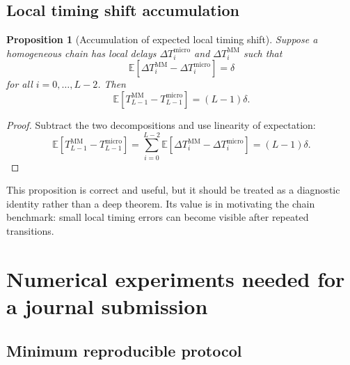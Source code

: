 \documentclass[12pt,a4paper]{article}
\newtheorem{proposition}{Proposition}
\theoremstyle{definition}
\newcommand{\E}{\mathbb{E}}
\newcommand{\1}{\mathbf{1}}
\begin{document}
\subsection{Local timing shift accumulation}

\begin{proposition}[Accumulation of expected local timing shift]
Suppose a homogeneous chain has local delays $\Delta T_i^{\mathrm{micro}}$ and $\Delta T_i^{\mathrm{MM}}$ such that
\begin{equation}
    \E[\Delta T_i^{\mathrm{MM}}-\Delta T_i^{\mathrm{micro}}]=\delta
\end{equation}
for all $i=0,\ldots,L-2$.  Then
\begin{equation}
    \E[T_{L-1}^{\mathrm{MM}}-T_{L-1}^{\mathrm{micro}}]=(L-1)\delta.
\end{equation}
\end{proposition}

\begin{proof}
Subtract the two decompositions and use linearity of expectation:
\begin{equation}
    \E[T_{L-1}^{\mathrm{MM}}-T_{L-1}^{\mathrm{micro}}]
    =\sum_{i=0}^{L-2}\E[\Delta T_i^{\mathrm{MM}}-\Delta T_i^{\mathrm{micro}}]
    =(L-1)\delta.
\end{equation}
\end{proof}

This proposition is correct and useful, but it should be treated as a diagnostic identity rather than a deep theorem.  Its value is in motivating the chain benchmark: small local timing errors can become visible after repeated transitions.

\section{Numerical experiments needed for a journal submission}

\subsection{Minimum reproducible protocol}
\end{document}
